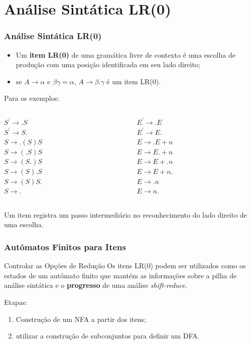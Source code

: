 \documentclass[table]{beamer}
\begin{document}
\section{Análise Sintática LR(0)}
\begin{frame}
   \frametitle{Análise Sintática LR(0)}
   \begin{itemize}
      \item Um \textbf{item LR(0)} de uma gramática livre de contexto é uma escolha de produção com uma posição identificada em seu lado direito; 
      \item se $A\to\alpha$ e $\beta\gamma=\alpha$, $A\to\beta.\gamma$ é um item LR(0). 
   \end{itemize}  
   Para os exemplos: \\
   \begin{columns}
   \begin{column}{0.4\textwidth}
   $S^{'}\to.S$  \\ 
   $S^{'}\to S.$ \\
   $S\to.(S)S$   \\
   $S\to(.S)S$   \\
   $S\to(S.)S$   \\
   $S\to(S).S$   \\
   $S\to(S)S.$   \\
   $S\to.$   \\
   \end{column}
   \begin{column}{0.4\textwidth}
   $E^{'}\to.E$   \\
   $E^{'}\to E.$  \\
   $E\to.E + n$   \\
   $E\to E. + n$  \\
   $E\to E +. n$  \\
   $E\to E + n.$  \\
   $E\to .n$      \\
   $E\to n.$      \\
   \end{column}
   \end{columns}
   \vspace{0.3cm}
   Um item registra um passo intermediário no reconhecimento do lado direito de uma escolha.
\end{frame}

\begin{frame}
   \frametitle{Autômatos Finitos para Itens}
   \begin{block}{Controlar as Opções de Redução}
   Os itens LR(0) podem ser utilizados como os estados de um autômato finito que mantém as informações sobre a pilha de análise sintática e o \textbf{progresso} de uma análise \textit{shift-reduce}.
   \end{block}
   Etapas:
   \begin{enumerate}
      \item Construção de um NFA a partir dos itens;
      \item utilizar a construção de subconjuntos para definir um DFA.
   \end{enumerate}
\end{frame}
\end{document}
